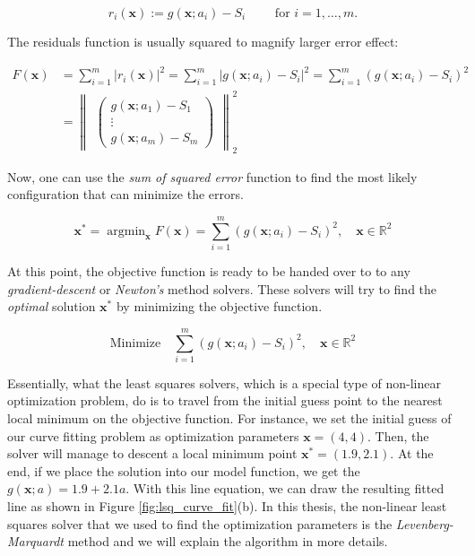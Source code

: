 \documentclass[12pt]{report}
\numberwithin{figure}{section}
\newcommand{\argmin}{\mathop{\mathrm{argmin}}}
\newcommand{\R}{\mathbb{R}}
\begin{document}
\begin{appendices}
\begin{equation}
  r_i(\mathbf{x}) := g(\mathbf{x};a_i) - S_i \qquad \text{ for }  i = 1,\dots,m.
\label{eq:}
\end{equation}

The residuals function is usually squared to magnify larger error effect:

\begin{equation}
\begin{aligned}
  F(\mathbf{x}) & = \sum_{i=1}^{m} \vert r_i(\mathbf{x}) \vert^2 = 
  \sum_{i=1}^{m} \vert g(\mathbf{x};a_i) - S_i \vert^2 =
  \sum_{i=1}^{m} (g(\mathbf{x};a_i) - S_i)^2 \\
& = \begin{Vmatrix}
  \begin{pmatrix} g(\mathbf{x};a_1) - S_1 \\ \vdots \\ g(\mathbf{x};a_m) - S_m \end{pmatrix} 
\end{Vmatrix}_2^2
\label{eq}
\end{aligned}
\end{equation}

Now, one can use the \textit{sum of squared error} function to find the most likely
configuration that can minimize the errors. 

\begin{equation}
  \mathbf{x}^* = \argmin_{\mathbf{x}} F(\mathbf{x}) = 
  \sum_{i=1}^{m} (g(\mathbf{x};a_i) - S_i)^2, 
  \quad \mathbf{x} \in \R^2
\label{eq}
\end{equation}

At this point, the objective function is ready to be handed over to 
to any \textit{gradient-descent} or 
\textit{Newton's} method solvers.
These solvers will try to find the
\textit{optimal} solution $\mathbf{x}^*$ by minimizing the objective function.

\begin{equation}
  \text{Minimize} \quad \sum_{i=1}^{m} (g(\mathbf{x};a_i) - S_i)^2, 
\quad \mathbf{x} \in \R^2
\label{eq}
\end{equation}

Essentially, what the least squares solvers, which is a special type of 
non-linear optimization problem, 
do is to travel from the initial guess point to the nearest local minimum 
on the objective function. 
For instance, we set  
the initial guess of our curve fitting problem 
as optimization parameters $\mathbf{x}=(4,4)$. 
Then, the solver will 
manage to descent a local minimum point 
$\mathbf{\mathbf{x^*}}=(1.9,2.1)$. 
At the end, if we place the solution into our model function, we
get the $g(\mathbf{x};a)=1.9+2.1a$. With this line equation, we can draw the resulting fitted line 
as shown in Figure \ref{fig:lsq_curve_fit}(b).
In this thesis, the non-linear least squares solver that we used to find the 
optimization 
parameters is the \textit{Levenberg-Marquardt} method and we will explain 
the algorithm in more details.


\end{appendices}
\end{document}
